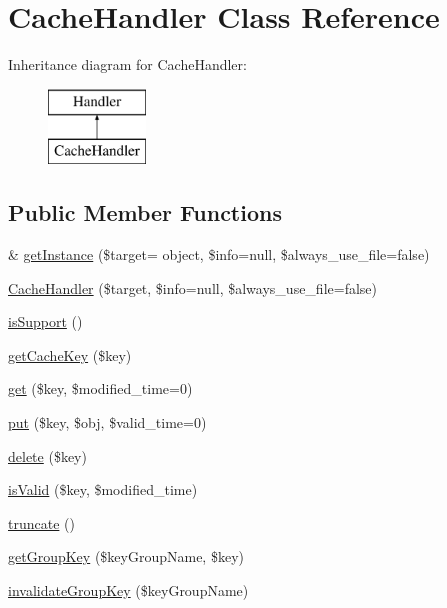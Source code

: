 \hypertarget{classCacheHandler}{}\section{Cache\+Handler Class Reference}
\label{classCacheHandler}
Inheritance diagram for Cache\+Handler\+:\begin{figure}[H]
\begin{center}
\leavevmode
\includegraphics[height=2.000000cm]{classCacheHandler}
\end{center}
\end{figure}
\subsection*{Public Member Functions}
\begin{DoxyCompactItemize}
\item 
\& \hyperlink{classCacheHandler_a2fce85cb82ab180ce9d6bcea61a54eec}{get\+Instance} (\$target= \textquotesingle{}object\textquotesingle{}, \$info=null, \$always\+\_\+use\+\_\+file=false)
\item 
\hyperlink{classCacheHandler_a71cb13c8791b73a8153fd5bbc7aba3e3}{Cache\+Handler} (\$target, \$info=null, \$always\+\_\+use\+\_\+file=false)
\item 
\hyperlink{classCacheHandler_a4c137721670e0e9ce1d60bdd2f7235bb}{is\+Support} ()
\item 
\hyperlink{classCacheHandler_ab849392ce5ea0d57208f39d8a6a4fa43}{get\+Cache\+Key} (\$key)
\item 
\hyperlink{classCacheHandler_af726ae7803e5a73dee47bb43fc1fb8fc}{get} (\$key, \$modified\+\_\+time=0)
\item 
\hyperlink{classCacheHandler_af7fe9532fb10504cee980d7581a31995}{put} (\$key, \$obj, \$valid\+\_\+time=0)
\item 
\hyperlink{classCacheHandler_af51c1473c877ab5e20336d0d719c27d7}{delete} (\$key)
\item 
\hyperlink{classCacheHandler_aea9da5e2293a9062bc7a5f0a4104c9ce}{is\+Valid} (\$key, \$modified\+\_\+time)
\item 
\hyperlink{classCacheHandler_a10046e23ee8c8ef41bbbb69b2dda7889}{truncate} ()
\item 
\hyperlink{classCacheHandler_ab777b6b22477848324a25346da869596}{get\+Group\+Key} (\$key\+Group\+Name, \$key)
\item 
\hyperlink{classCacheHandler_a43118f91508ad5695a13f7a332cc9389}{invalidate\+Group\+Key} (\$key\+Group\+Name)
\end{DoxyCompactItemize}
